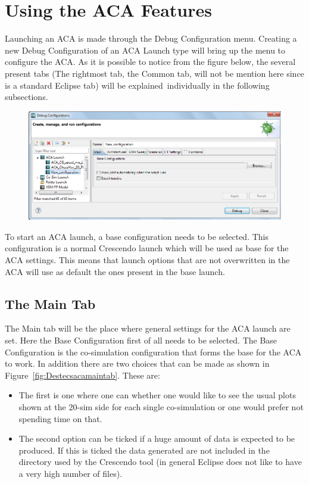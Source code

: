 \documentclass{crescendorepchap}
\begin{document}
\section{Using the ACA Features}

Launching an ACA is made through the Debug Configuration menu.
Creating a new Debug Configuration of an ACA Launch type will bring up
the menu to configure the ACA. As it is possible to notice from the
figure below, the several present tabs (The rightmost tab, the Common
tab, will not be mention here since is a standard Eclipse tab) will be
explained~individually in the following subsections.

\begin{figure}[htbp]
\centering
\includegraphics[width=.6\textwidth]{images/DestecsACAdebugconfig.png}
\caption{}
\end{figure}

To start an ACA launch, a base configuration needs to be selected. This
configuration is a normal Crescendo launch which will be used as base for
the ACA settings. This means that launch options that are not
overwritten in the ACA will use as default the ones present in the base
launch.

\subsection{The Main Tab}

The Main tab will be the place where general settings for the ACA launch
are set. Here the Base Configuration first of all needs to be selected.
The Base Configuration is the co-simulation configuration that
forms the base for the ACA to work. In addition there are two choices that can
be made as shown in Figure~\ref{fig:Destecsacamaintab}. These are:

\begin{itemize}
\item The first is one where one can whether one would like to see the usual plots shown at the 20-sim side for each single co-simulation or one would prefer not spending time on that.
\item The second option can be ticked if a huge amount of data is expected to be produced. If this is ticked the data generated are not included in the directory used by the Crescendo tool (in general Eclipse does not like to have a very high number of files). 
\end{itemize}
\end{document}
